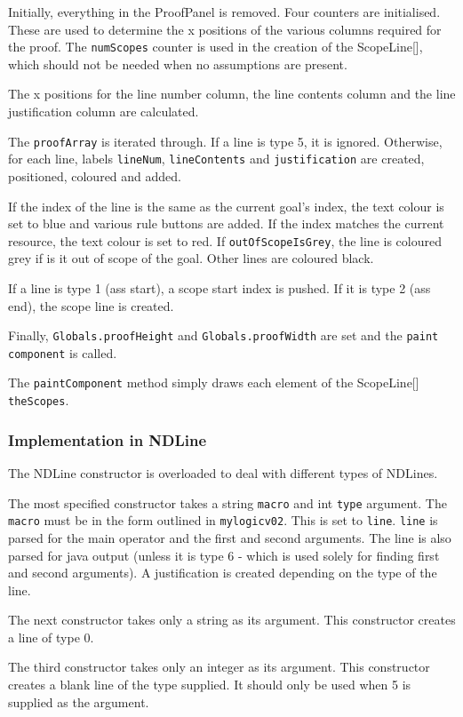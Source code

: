 \documentclass[a4paper]{article}
\begin{document}
Initially, everything in the ProofPanel is removed. Four counters are initialised. These are used to determine the x positions of the various columns required for the proof. The \texttt{numScopes} counter is used in the creation of the ScopeLine[], which should not be needed when no assumptions are present.

The x positions for the line number column, the line contents column and the line justification column are calculated.

The \texttt{proofArray} is iterated through. If a line is type 5, it is ignored. Otherwise, for each line, labels \texttt{lineNum}, \texttt{lineContents} and \texttt{justification} are created, positioned, coloured and added.

If the index of the line is the same as the current goal's index, the text colour is set to blue and various rule buttons are added. If the index matches the current resource, the text colour is set to red. If \texttt{outOfScopeIsGrey}, the line is coloured grey if is it out of scope of the goal. Other lines are coloured black.

If a line is type 1 (ass start), a scope start index is pushed. If it is type 2 (ass end), the scope line is created.

Finally, \texttt{Globals.proofHeight} and \texttt{Globals.proofWidth} are set and the \texttt{paint component} is called.

The \texttt{paintComponent} method simply draws each element of the ScopeLine[] \texttt{theScopes}.

\subsubsection{Implementation in NDLine}
The NDLine constructor is overloaded to deal with different types of NDLines.

The most specified constructor takes a string \texttt{macro} and int \texttt{type} argument. The \texttt{macro} must be in the form outlined in \texttt{mylogicv02}. This is set to \texttt{line}. \texttt{line} is parsed for the main operator and the first and second arguments.  The line is also parsed for java output (unless it is type 6 - which is used solely for finding first and second arguments). A justification is created depending on the type of the line.

The next constructor takes only a string as its argument. This constructor creates a line of type 0.

The third constructor takes only an integer as its argument. This constructor creates a blank line of the type supplied. It should only be used when 5 is supplied as the argument.
\end{document}
